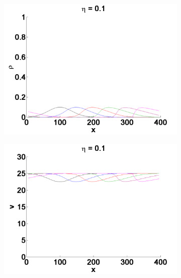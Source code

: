 \begin{figure}[h!]
\begin{subfigure}{.375\textwidth}
	\centering
	\includegraphics[width=\textwidth]{img/exc3_p_01}
	\caption{}
	\label{fig:exc3_congestion_eta01_p}
\end{subfigure}
\begin{subfigure}{.375\textwidth}
	\centering
	\includegraphics[width=\textwidth]{img/exc3_v_01}
	\caption{}
	\label{fig:exc3_congestion_eta01_v}
\end{subfigure}
\begin{subfigure}{.09\textwidth}
	\centering

\end{subfigure}
\end{figure}
